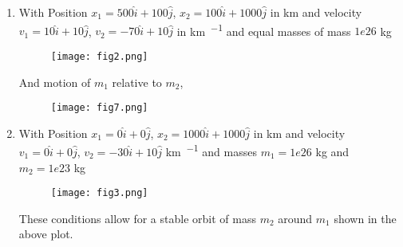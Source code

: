 \begin{enumerate}
        \newpage

\drawBorder

    \item
        With Position $x_1 = 500\hat{i} + 100\hat{j}$, $x_2 = 100\hat{i} + 1000\hat{j}$ in km and velocity $v_1 = 10\hat{i} + 10\hat{j}$, $v_2 = -70\hat{i} + 10\hat{j}$ in \si{\km \per \sec} and equal masses of mass $1e26$ kg

        \begin{figure}[h!]
            \texttt{[image: fig2.png]}
            \centering
        \end{figure}

        And motion of $m_1$ relative to $m_2$,

        \begin{figure}[h!]
            \texttt{[image: fig7.png]}
            \centering
        \end{figure}


        \newpage

\drawBorder

    \item
        With Position $x_1 = 0\hat{i} + 0\hat{j}$, $x_2 = 1000\hat{i} + 1000\hat{j}$ in \si{\km} and velocity $v_1 = 0\hat{i} + 0\hat{j}$, $v_2 = -30\hat{i} + 10\hat{j}$ \si{\km \per \sec} and masses $m_1 = 1e26$ kg and $m_2 = 1e23$ kg

        \begin{figure}[h!]
            \texttt{[image: fig3.png]}
            \centering
        \end{figure}

        These conditions allow for a stable orbit of mass $m_2$ around $m_1$ shown in the above plot.

\end{enumerate}
